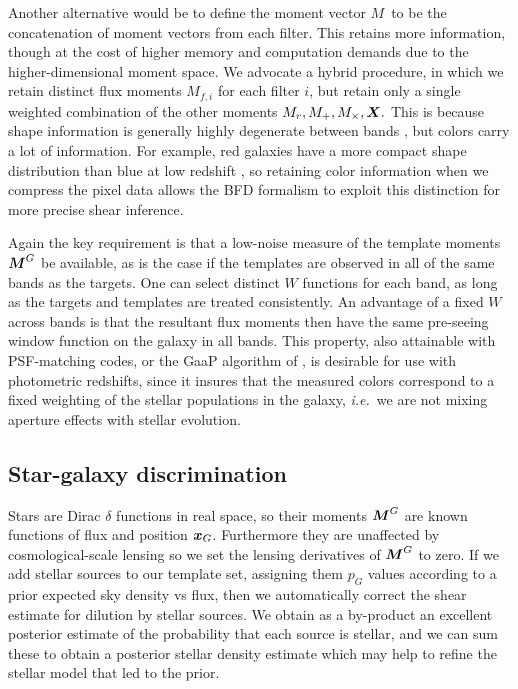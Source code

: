 \documentclass[11pt,preprint,flushrt]{aastex}
\newcommand\ie{{\it i.e.\/}}
\newcommand{\vecX}{\mbox{\boldmath $X$}}
\newcommand{\vecM}{\mbox{\boldmath $M$}}
\newcommand{\vecx}{\mbox{\boldmath $x$}}
\begin{document}
Another alternative would be to define the moment vector \vecM\ to be
the concatenation of moment vectors from each filter.  This retains
more information, though at the cost of higher memory and 
computation demands due to the higher-dimensional moment space.  
We advocate a hybrid procedure, in which we retain distinct flux
moments $M_{f,i}$ for each filter $i$, but retain only a single
weighted combination of the other moments $M_r, M_+, M_\times, \vecX.$
This is because shape information is generally highly degenerate
between bands \citep{jarvisfilters}, but colors carry a lot of
information.  For example, red galaxies have a more compact shape
distribution than blue at low redshift \citep{bj02}, so retaining
color information when we compress the pixel data allows the BFD
formalism to exploit this distinction for more precise shear
inference.

Again the key requirement is that a low-noise measure of the template moments
$\vecM^G$ be available, as is the case if the templates are observed
in all of the same bands as the targets.  One can select distinct $W$
functions for each band, as long as the targets and templates are
treated consistently.  An advantage of a fixed $W$ across bands is
that the resultant flux moments then have the same pre-seeing window
function on the galaxy in all bands.  This property, also attainable with
PSF-matching codes, or the {\sc GaaP} algorithm of \citet{gaap}, is desirable
for use with photometric redshifts, since it insures that the measured
colors correspond to a fixed weighting of the stellar populations in
the galaxy, \ie\ we are not mixing aperture effects with stellar
evolution.

\subsection{Star-galaxy discrimination}
Stars are Dirac $\delta$ functions in real space, so their moments
$\vecM^G$ are known functions of flux and position $\vecx_G$.  Furthermore they are
unaffected by cosmological-scale lensing so we set the lensing derivatives of
$\vecM^G$ to zero.  If we add stellar sources to our template set,
assigning them $p_G$ values according to a prior expected sky 
density vs flux, then we automatically correct the shear estimate for
dilution by stellar sources.  We obtain as a by-product an excellent
posterior estimate of the probability that each source is stellar, and
we can sum these to obtain a posterior
stellar density estimate which may help to refine the stellar model that led to
the prior.  
\end{document}
